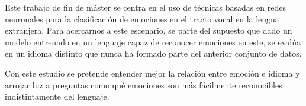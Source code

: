 \documentclass[11pt,a4paper,spanish]{book}
\begin{document}
	Este trabajo de fin de máster se centra en el uso de técnicas basadas en redes neuronales para la clasificación de emociones en el tracto vocal en la lengua extranjera. Para acercarnos a este escenario, se parte del supuesto que dado un modelo entrenado en un lenguaje capaz de reconocer emociones en este, se evalúa en un idioma distinto que nunca ha formado parte del anterior conjunto de datos. 
	
	Con este estudio se pretende entender mejor la relación entre emoción e idioma y arrojar luz a preguntas como qué emociones son más fácilmente reconocibles indistintamente del lenguaje. 
	\begin{comment}
		[Estado del Arte]
		La expresión de las emociones están íntimamente relacionadas con las propiedades fonéticas en el habla donde se observan señales y patrones para marcar contrastes lingüísticos en un idioma \cite{Pell2001} por lo tanto, los efectos del lenguaje en la comunicación emocional son evidentes al haber sido observadas y medidas, las variaciones en el rango tonal y la frecuencia para expresarlas, cambiando no sólo el tono si no también el patrón lingüístico asociado \cite{Davletcharova2015}.
		[]
		 Por ejemplo la tristeza tiende a mostrarse con un tono notablemente bajo mientras que la felicidad, la sorpresa, o el enfado son producidas con un tono moderadamente alto. En general se esperaría que las expresiones de tristeza y enfado tiendan a marcar una mayor diferencia entre ellas y por lo tanto sean reconocidas con más precisión con independencia del lenguaje al estar situadas en los extremos (opuestos) del espectro.
		En literatura anterior \cite{Pell2011} se argumenta que las 6 emociones básicas felicidad, miedo, asco, sorpresa, enfado y tristeza) son exitósamente reconocidas desde la prosodia. Cabe destacar la diferencia entre prosodia y la calidad vocal, donde la primera se centra en características tales como la entonación, el estrés y el ritmo del habla mientras que la segunda se refiere al tono, energía y tempo \cite{Processing2015}.
		  
		[Estado del Arte]
		Por otro lado tanto la proporción de consonantes y vocales (que hacen variar la presión de aire que se necesita) como el ratio de sílabas por palabra en cada idioma, caracterizan la expresión oral de las emociones. Existen muchos factores relacionados con el lenguaje como la morfología o la duración del estímulo que podrían ser un impacto en la decodificación de los matices en la señal vocal, tal y como explica en \cite{Chen2017}.	
		Existe una clasificación dependiendo de la velocidad silábica en la expresión de dichos idiomas, sin embargo poco se conoce acerca de los efectos en las medidas respiratorias en el habla.Esta observación puede llevar a que se pregunte si en lenguajes tan dispares, las emociones expresadas mediante la voz puedan ser reconocidas desde el punto de vista del otro idioma.
		

\end{comment}
\end{document}

